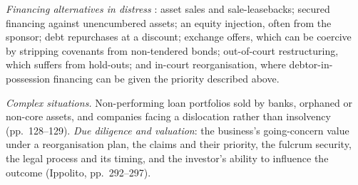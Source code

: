 \begin{qfmethod}
\emph{Financing alternatives in distress} \citep[pp.~291--297]{ippolito-private-capital-2020}: asset sales and sale-leasebacks; secured financing against unencumbered assets; an equity injection, often from the sponsor; debt repurchases at a discount; exchange offers, which can be coercive by stripping covenants from non-tendered bonds; out-of-court restructuring, which suffers from hold-outs; and in-court reorganisation, where debtor-in-possession financing can be given the priority described above.

\emph{Complex situations.} Non-performing loan portfolios sold by banks, orphaned or non-core assets, and companies facing a dislocation rather than insolvency (pp.~128--129). \emph{Due diligence and valuation}: the business's going-concern value under a reorganisation plan, the claims and their priority, the fulcrum security, the legal process and its timing, and the investor's ability to influence the outcome (Ippolito, pp.~292--297).


\end{qfmethod}
